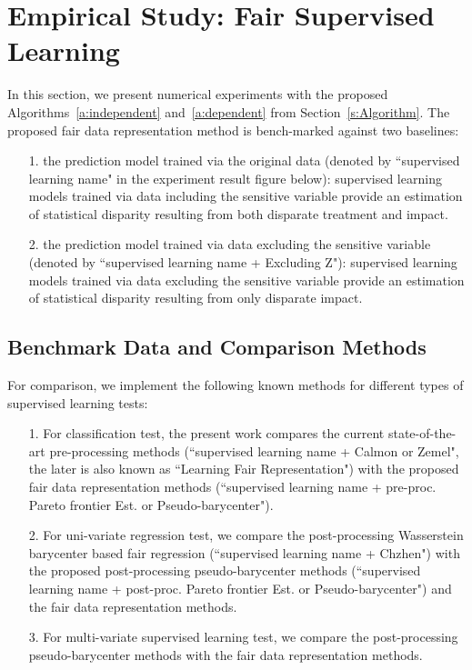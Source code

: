 \documentclass[twoside,11pt]{article}
\begin{document}
\section{Empirical Study: Fair Supervised Learning}\label{s:Numerics}

In this section, we present numerical experiments with the proposed Algorithms~\ref{a:independent} and~\ref{a:dependent} from Section~\ref{s:Algorithm}. The proposed fair data representation method is bench-marked against two baselines:

\begin{itemize}
\setlength{\parsep}{-0.2ex}
\setlength{\itemsep}{-0.2ex}
\item[1.] the prediction model trained via the original data (denoted by ``supervised learning name" in the experiment result figure below): supervised learning models trained via data including the sensitive variable provide an estimation of statistical disparity resulting from both disparate treatment and impact.
\item[2.] the prediction model trained via data excluding the sensitive variable (denoted by ``supervised learning name + Excluding Z"): supervised learning models trained via data excluding the sensitive variable provide an estimation of statistical disparity resulting from only disparate impact.
\end{itemize}

\subsection{Benchmark Data and Comparison Methods}

For comparison, we implement the following known methods for different types of supervised learning tests:

\begin{itemize}
\setlength{\parsep}{-0.2ex}
\setlength{\itemsep}{-0.2ex}
\item[1.] For classification test, the present work compares the current state-of-the-art pre-processing methods \cite{calmon2017optimized, zemel2013learning} (``supervised learning name + Calmon or Zemel", the later is also known as ``Learning Fair Representation") with the proposed fair data representation methods (``supervised learning name + pre-proc. Pareto frontier Est. or Pseudo-barycenter").
\item[2.] For uni-variate regression test, we compare the post-processing Wasserstein barycenter based fair regression \cite{chzhen2020fair} (``supervised learning name + Chzhen") with the proposed post-processing pseudo-barycenter methods (``supervised learning name + post-proc. Pareto frontier Est. or Pseudo-barycenter") and the fair data representation methods.
\item[3.] For multi-variate supervised learning test, we compare the post-processing pseudo-barycenter methods with the fair data representation methods.
\end{itemize}
\end{document}
